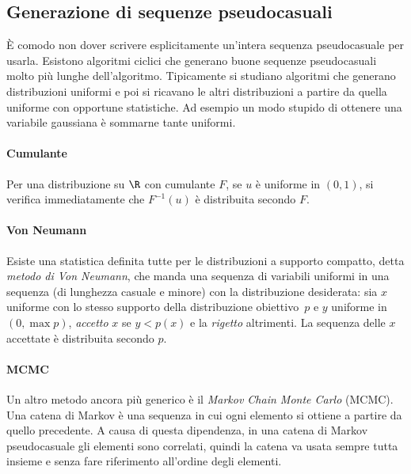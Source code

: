 \subsection{Generazione di sequenze pseudocasuali}

È comodo non dover scrivere esplicitamente un'intera sequenza pseudocasuale per usarla.
Esistono algoritmi ciclici che generano buone sequenze pseudocasuali molto più lunghe dell'algoritmo.
Tipicamente si studiano algoritmi che generano distribuzioni uniformi e poi si ricavano le altri distribuzioni a partire da quella uniforme con opportune statistiche.
Ad esempio un modo stupido di ottenere una variabile gaussiana è sommarne tante uniformi.

\paragraph{Cumulante}

Per una distribuzione su $\R$ con cumulante $F$,
se $u$ è uniforme in $(0,1)$,
si verifica immediatamente che $F^{-1}(u)$ è distribuita secondo $F$.

\paragraph{Von Neumann}

Esiste una statistica definita tutte per le distribuzioni a supporto compatto,
detta \emph{metodo di Von Neumann},
che manda una sequenza di variabili uniformi in una sequenza (di lunghezza casuale e minore) con la distribuzione desiderata:
sia $x$ uniforme con lo stesso supporto della distribuzione obiettivo~$p$
e $y$ uniforme in $(0,\max p)$, \emph{accetto} $x$ se $y<p(x)$ e la \emph{rigetto} altrimenti.
La sequenza delle $x$ accettate è distribuita secondo $p$.

\paragraph{MCMC}

Un altro metodo ancora più generico è il \emph{Markov Chain Monte Carlo} (MCMC).
Una catena di Markov è una sequenza in cui ogni elemento si ottiene a partire da quello precedente.
A causa di questa dipendenza,
in una catena di Markov pseudocasuale gli elementi sono correlati,
quindi la catena va usata sempre tutta insieme e senza fare riferimento all'ordine degli elementi.

